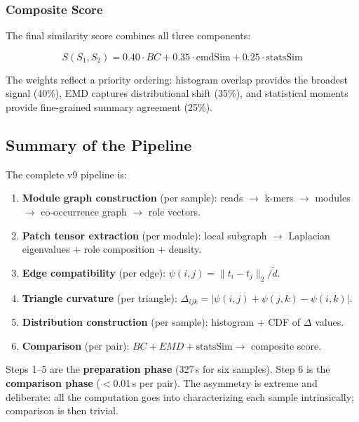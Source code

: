 \documentclass{../yalumba}
\begin{document}
\subsubsection{Composite Score}

The final similarity score combines all three components:

\begin{equation}
  S(S_1, S_2) = 0.40 \cdot BC + 0.35 \cdot \text{emdSim}
              + 0.25 \cdot \text{statsSim}
  \label{eq:composite}
\end{equation}


The weights reflect a priority ordering: histogram overlap provides the
broadest signal (40\%), EMD captures distributional shift (35\%), and
statistical moments provide fine-grained summary agreement (25\%).

\subsection{Summary of the Pipeline}

The complete v9 pipeline is:

\begin{enumerate}
  \item \textbf{Module graph construction} (per sample): reads $\to$
    k-mers $\to$ modules $\to$ co-occurrence graph $\to$ role vectors.
  \item \textbf{Patch tensor extraction} (per module): local subgraph $\to$
    Laplacian eigenvalues + role composition + density.
  \item \textbf{Edge compatibility} (per edge): $\psi(i,j) = \|t_i -
    t_j\|_2 / \tilde{d}$.
  \item \textbf{Triangle curvature} (per triangle): $\Delta_{ijk} =
    |\psi(i,j) + \psi(j,k) - \psi(i,k)|$.
  \item \textbf{Distribution construction} (per sample): histogram +
    CDF of $\Delta$ values.
  \item \textbf{Comparison} (per pair): $BC + EMD + \text{statsSim}
    \to$ composite score.
\end{enumerate}

Steps 1--5 are the \textbf{preparation phase} (327\,s for six samples).
Step 6 is the \textbf{comparison phase} ($<$0.01\,s per pair).  The
asymmetry is extreme and deliberate: all the computation goes into
characterizing each sample intrinsically; comparison is then trivial.
\end{document}
